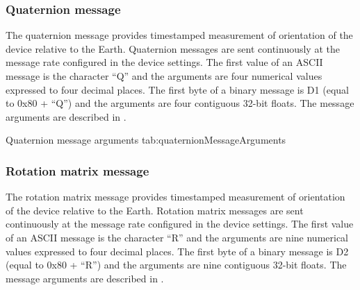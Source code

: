 \subsubsection{Quaternion message}

The quaternion message provides timestamped measurement of orientation of the device relative to the Earth.  Quaternion messages are sent continuously at the message rate configured in the device settings.  The first value of an \ac{ASCII} message is the character \enquote{Q} and the arguments are four numerical values expressed to four decimal places.  The first byte of a binary message is D1 (equal to 0x80 + \enquote{Q}) and the arguments are four contiguous 32-bit floats.  The message arguments are described in .

\begingroup
    \def\tempArgumentA{Quaternion W element}
    \def\tempArgumentB{Quaternion X element}
    \def\tempArgumentC{Quaternion Y element}
    \def\tempArgumentD{Quaternion Z element}
    \def\tempCaption{Quaternion message arguments}
    \def\tempLabel{tab:quaternionMessageArguments}
    \dataMessageTable
    {Quaternion message arguments}
    {tab:quaternionMessageArguments}
\endgroup

\begingroup
    \def\tempNameA{Quaternion W element}
    \def\tempNameB{Quaternion X element}
    \def\tempNameC{Quaternion Y element}
    \def\tempNameD{Quaternion Z element}
    \def\tempValueA{1}
    \def\tempValueB{0}
    \def\tempValueC{0}
    \def\tempValueD{0}
    \def\tempAsciiFirst{Q}
    \def\tempAsciiA{1.0000}
    \def\tempAsciiB{0.0000}
    \def\tempAsciiC{0.0000}
    \def\tempAsciiD{0.0000}
    \def\tempBinaryFirst{D1}
    \def\tempBinaryA{00 00 80 3F}
    \def\tempBinaryB{00 00 00 00}
    \def\tempBinaryC{00 00 00 00}
    \def\tempBinaryD{00 00 00 00}
    \dataMessageExample
\endgroup

\subsubsection{Rotation matrix message}

The rotation matrix message provides timestamped measurement of orientation of the device relative to the Earth.  Rotation matrix messages are sent continuously at the message rate configured in the device settings.  The first value of an \ac{ASCII} message is the character \enquote{R} and the arguments are nine numerical values expressed to four decimal places.  The first byte of a binary message is D2 (equal to 0x80 + \enquote{R}) and the arguments are nine contiguous 32-bit floats.  The message arguments are described in .


